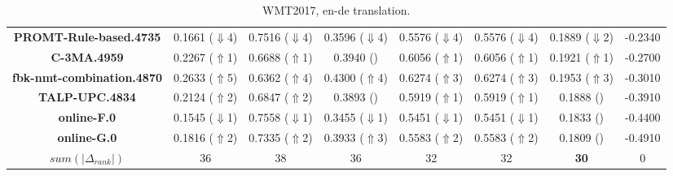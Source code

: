 \begin{table*}[ht]
\begin{tabular}{cccccccc}
\textbf{PROMT-Rule-based.4735} & {0.1661 ($\Downarrow$4)} & {0.7516 ($\Downarrow$4)} & {0.3596 ($\Downarrow$4)} & {0.5576 ($\Downarrow$4)} & {0.5576 ($\Downarrow$4)} & {0.1889 ($\Downarrow$2)} & {-0.2340} \\
\textbf{C-3MA.4959} & {0.2267 ($\Uparrow$1)} & {0.6688 ($\Uparrow$1)} & {0.3940 (\checkmark0)} & {0.6056 ($\Uparrow$1)} & {0.6056 ($\Uparrow$1)} & {0.1921 ($\Uparrow$1)} & {-0.2700} \\
\textbf{fbk-nmt-combination.4870} & {0.2633 ($\Uparrow$5)} & {0.6362 ($\Uparrow$4)} & {0.4300 ($\Uparrow$4)} & {0.6274 ($\Uparrow$3)} & {0.6274 ($\Uparrow$3)} & {0.1953 ($\Uparrow$3)} & {-0.3010} \\
\textbf{TALP-UPC.4834} & {0.2124 ($\Uparrow$2)} & {0.6847 ($\Uparrow$2)} & {0.3893 (\checkmark0)} & {0.5919 ($\Uparrow$1)} & {0.5919 ($\Uparrow$1)} & {0.1888 (\checkmark0)} & {-0.3910} \\
\textbf{online-F.0} & {0.1545 ($\Downarrow$1)} & {0.7558 ($\Downarrow$1)} & {0.3455 ($\Downarrow$1)} & {0.5451 ($\Downarrow$1)} & {0.5451 ($\Downarrow$1)} & {0.1833 (\checkmark0)} & {-0.4400} \\
\textbf{online-G.0} & {0.1816 ($\Uparrow$2)} & {0.7335 ($\Uparrow$2)} & {0.3933 ($\Uparrow$3)} & {0.5583 ($\Uparrow$2)} & {0.5583 ($\Uparrow$2)} & {0.1809 (\checkmark0)} & {-0.4910} \\
\midrule
$sum(|\Delta_{rank}|)$ & {36} & {38} & {36} & {32} & {32} & \textbf{30} & {0} \\
\bottomrule
\end{tabular}
\caption{\label{tab:wmt_2017_en-de}WMT2017, en-de translation.}
\end{table*}